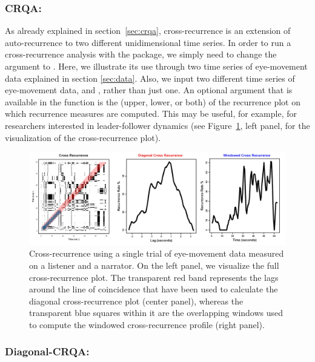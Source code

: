 \subsubsection[CRQA: crqa]{CRQA: }

As already explained in section~\ref{sec:crqa}, cross-recurrence is an extension of auto-recurrence to two different unidimensional time series. In order to run a cross-recurrence analysis with the  package, we simply need to change the  argument to . Here, we illustrate its use through two time series of eye-movement data explained in section \ref{sec:data}. Also, we input two different time series of eye-movement data,  and , rather than just one. An optional argument that is available in the  function is the  (upper, lower, or both) of the recurrence plot on which recurrence measures are computed. This may be useful, for example, for researchers interested in leader-follower dynamics (see Figure~\ref{fig:crqaeye}, left panel, for the visualization of the cross-recurrence plot).  

\begin{figure}
\includegraphics[width=\columnwidth]{Figure5_complete.png}
\caption{\label{fig:crqaeye} Cross-recurrence using a single trial of eye-movement data measured on a listener and a narrator. On the left panel, we visualize the full cross-recurrence plot. The transparent red band represents the lags around the line of coincidence that have been used to calculate the diagonal cross-recurrence plot (center panel), whereas the transparent blue squares within it are the overlapping windows used to compute the windowed cross-recurrence profile (right panel).}
\end{figure}

\subsubsection[Diagonal-CRQA: drpfromts]{Diagonal-CRQA: }

